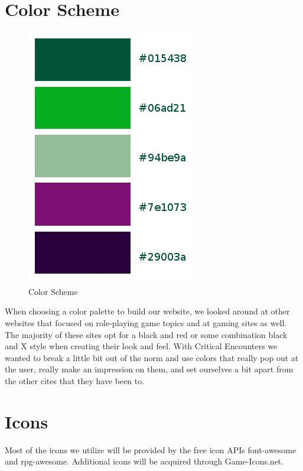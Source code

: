 \documentclass[12pt,a4paper]{report}
\begin{document}
	\section{Color Scheme}
	\begin{figure}[H]
		\centering
		\includegraphics[scale=.5]{colors}
		\caption{Color Scheme}
		\label{fig: Color Scheme}
	\end{figure}
	When choosing a color palette to build our website, we looked around at other websites that focused on role-playing game topics and at gaming sites as well. The majority of these sites opt for a black and red or some combination black and X style when creating their look and feel. With Critical Encounters we wanted to break a little bit out of the norm and use colors that really pop out at the user, really make an impression on them, and set ourselves a bit apart from the other cites that they have been to.
	\newpage
	\section{Icons}
	Most of the icons we utilize will be provided by the free icon APIs font-awesome\cite{font-awesome} and rpg-awesome\cite{rpg-awesome}. Additional icons will be acquired through Game-Icons.net.
\end{document}

